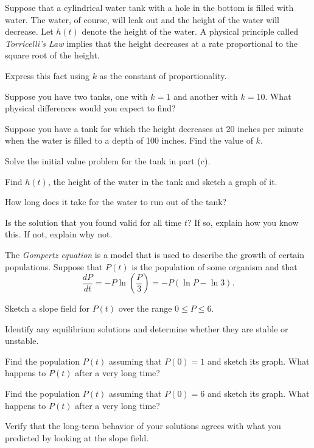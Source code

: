 \begin{exercises}
  \item  Suppose that a cylindrical water tank with a hole in the
    bottom is filled with water.  The water, of course, will leak out
    and the height of the water will decrease.  Let $h(t)$ denote the
    height of the water.  A physical principle called {\em Torricelli's
      Law} implies that the height decreases at a rate proportional to
    the square root of the height.

    \ba
    \item Express this fact using $k$ as the constant of
      proportionality.  
    \item Suppose you have two tanks, one with $k=1$ and another with
      $k=10$.  What physical differences would you expect to find?
    \item Suppose you have a tank for which the height decreases at 20
      inches per minute when the water is filled to a depth of 100
      inches.  Find the value of $k$.  
    \item Solve the initial value problem for the tank in part (c).
    \item Find $h(t)$, the height of the water in the tank and sketch
      a graph of it.
    \item How long does it take for the water to run out of the tank?
    \item Is the solution that you found valid for all time $t$?  If
      so, explain how you know this.  If not, explain why not.
    \ea

  \item The {\em Gompertz equation} is a model that is used to
    describe the growth of certain populations.  Suppose that $P(t)$
    is the population of some organism and that
    $$
    \frac{dP}{dt} = -P\ln\left(\frac P3\right) = -P(\ln P - \ln 3).
    $$

    \ba
    \item Sketch a slope field for $P(t)$ over the range $0\leq P\leq
      6$.

    \item Identify any equilibrium solutions and determine whether
      they are stable or unstable.

    \item Find the population $P(t)$ assuming that $P(0) = 1$ and sketch
      its graph.  What happens to $P(t)$ after a very long time?

    \item Find the population $P(t)$ assuming that $P(0) = 6$ and sketch
      its graph.  What happens to $P(t)$ after a very long time?

    \item Verify that the long-term behavior of your solutions agrees
      with what you predicted by looking at the slope field.

      \ea
        
\end{exercises}
\afterexercises
